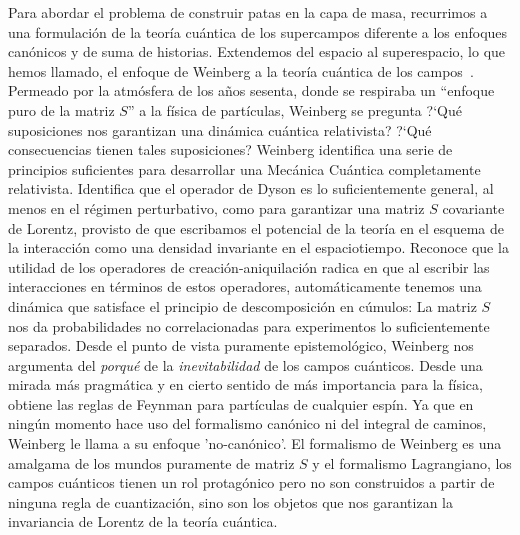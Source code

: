 Para abordar el problema de construir patas en la capa de masa, recurrimos a una  formulación  de la teoría cuántica de  los supercampos diferente a los enfoques canónicos y de suma de historias. Extendemos  del espacio al superespacio, lo que hemos  llamado, el enfoque de Weinberg a la teoría cuántica de los campos~\cite{Weinberg:1964cn,Weinberg:1969di,Weinberg:1995mt}. Permeado por la atmósfera de los a\~nos sesenta, donde se respiraba un ``enfoque puro de la matriz $ S $'' a la física de partículas, Weinberg se pregunta ?`Qué suposiciones nos garantizan una dinámica cuántica relativista? ?`Qué consecuencias tienen tales suposiciones?  Weinberg identifica una serie de  principios suficientes para desarrollar una Mecánica Cuántica completamente relativista. Identifica que el operador de Dyson es lo suficientemente general, al menos en el régimen perturbativo, como para garantizar una matriz $ S $ covariante de Lorentz, provisto de que  escribamos el potencial de la teoría  en el esquema de la interacción como una densidad invariante en el espaciotiempo. Reconoce que la utilidad de los operadores de creación-aniquilación radica en que al escribir las interacciones en términos de estos operadores, automáticamente tenemos una dinámica que satisface el principio de  descomposición en cúmulos: La matriz $ S $ nos da probabilidades no correlacionadas para experimentos lo suficientemente separados. Desde el punto de vista puramente epistemológico, Weinberg nos  argumenta del \textit{porqué} de la \textit{inevitabilidad} de los campos cuánticos. Desde una mirada más pragmática y en cierto sentido de más importancia para la física, obtiene las reglas de Feynman para partículas de cualquier espín. Ya que en ningún momento hace uso del formalismo canónico ni del integral de caminos, Weinberg le llama a su enfoque 'no-canónico'. El formalismo de Weinberg es una amalgama de los mundos  puramente de matriz $ S $ y el formalismo Lagrangiano, los campos cuánticos tienen un rol protagónico pero no son construidos a partir de ninguna regla de cuantizaci\'on, sino son los objetos que nos garantizan la invariancia de Lorentz de la teoría cuántica.

